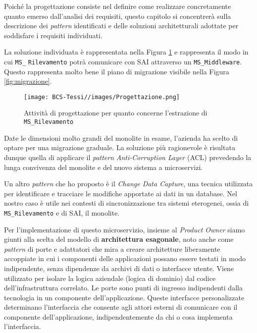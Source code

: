         \vspace{0.2 em}
        \noindent Poiché la progettazione consiste nel definire come realizzare concretamente quanto emerso dall’analisi dei requisiti, questo capitolo si concentrerà sulla descrizione dei \textit{pattern} identificati e delle soluzioni architetturali adottate per soddisfare i requisiti individuati.

        \vspace{0.2 em}
        \noindent La soluzione individuata è rappresentata nella Figura \ref{fig:progettazione} e rappresenta il modo in cui \texttt{MS\_} \texttt{Rilevamento} potrà comunicare con SAI attraverso un \texttt{MS\_Middleware}. Questo rappresenta molto bene il piano di migrazione visibile nella Figura \ref{fig:migrazione}.
        
        \begin{figure}
            \centering
            \texttt{[image: BCS-Tessi//images/Progettazione.png]}
            \caption[Progettazione per l'estrazione del microservizio]{Attività di progettazione per quanto concerne l'estrazione di \texttt{MS\_Rilevamento}}
            \label{fig:progettazione}
        \end{figure}

        \vspace{0.2 em}
        \noindent Date le dimensioni molto grandi del monolite in esame, l'azienda ha scelto di optare per una migrazione graduale. La soluzione più ragionevole è risultata dunque quella di applicare il \textit{pattern} \textit{Anti-Corruption Layer} (ACL) prevedendo la lunga convivenza del monolite e del nuovo sistema a microservizi. 

        \vspace{0.2 em}
        \noindent Un altro \textit{pattern} che ho proposto è il \textit{Change Data Capture}, una tecnica utilizzata per identificare e tracciare le modifiche apportate ai dati in un database. Nel nostro caso è utile nei contesti di sincronizzazione tra sistemi eterogenei, ossia di \texttt{MS\_Rilevamento} e di SAI, il monolite. 

        \vspace{0.2em}
        \noindent Per l'implementazione di questo microservizio, insieme al \textit{Product Owner} siamo giunti alla scelta del modello di \textbf{architettura esagonale}, noto anche come \textit{pattern} di porte e adattatori che mira a creare architetture liberamente accoppiate in cui i componenti delle applicazioni possano essere testati in modo indipendente, senza dipendenze da archivi di dati o interfacce utente. Viene utilizzato per isolare la logica aziendale (logica di dominio) dal codice dell'infrastruttura correlato. Le porte sono punti di ingresso indipendenti dalla tecnologia in un componente dell'applicazione. Queste interfacce personalizzate determinano l'interfaccia che consente agli attori esterni di comunicare con il componente dell'applicazione, indipendentemente da chi o cosa implementa l'interfaccia.

